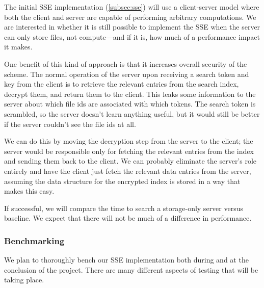 


The initial SSE implementation (\ref{subsec:sse}) will use a client-server model where both the client and server are capable of performing arbitrary computations.
We are interested in whether it is still possible to implement the SSE when the server can only store files, not compute---and if it is, how much of a performance impact it makes.

One benefit of this kind of approach is that it increases overall security of the scheme.
The normal operation of the server upon receiving a search token and key from the client is to retrieve the relevant entries from the search index, decrypt them, and return them to the client.
This leaks some information to the server about which file ids are associated with which tokens.
The search token is scrambled, so the server doesn't learn anything useful, but it would still be better if the server couldn't see the file ids at all. 

We can do this by moving the decryption step from the server to the client; 
the server would be responsible only for fetching the relevant entries from the index and sending them back to the client.
We can probably eliminate the server's role entirely and have the client just fetch the relevant data entries from the server, assuming the data structure for the encrypted index is stored in a way that makes this easy.


If successful, we will compare the time to search a storage-only server versus baseline. We expect that there will not be much of a difference in performance.

\subsubsection {Benchmarking}
\label{subsec:benchmark}

We plan to thoroughly bench our SSE implementation both during and at the conclusion of the project.
There are many different aspects of testing that will be taking place.

